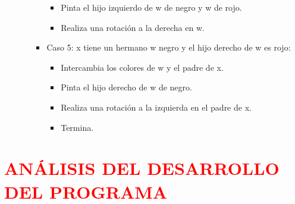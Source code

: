 \documentclass[12pt]{article}
\begin{document}
\begin{enumerate}
\begin{itemize}
\begin{itemize}
\begin{itemize}
                \item Pinta el hijo izquierdo de w de negro y w de rojo.
                \item Realiza una rotación a la derecha en w.
            \end{itemize}
            \item Caso 5: x tiene un hermano w negro y el hijo derecho de w es rojo:
            \begin{itemize}
                \item Intercambia los colores de w y el padre de x.
                \item Pinta el hijo derecho de w de negro.
                \item Realiza una rotación a la izquierda en el padre de x.
                \item Termina.
            \end{itemize}
        \end{itemize}
    \end{itemize}
\end{enumerate}



\section*{\textcolor{red}{\textbf{ANÁLISIS DEL DESARROLLO DEL PROGRAMA}}}
\end{document}
